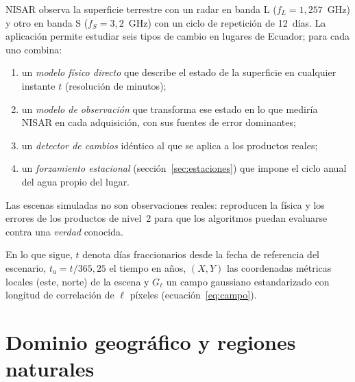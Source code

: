 \documentclass[11pt,a4paper]{article}
\begin{document}
NISAR observa la superficie terrestre con un radar en banda L ($f_L = 1{,}257$~GHz) y otro en banda S
($f_S = 3{,}2$~GHz) con un ciclo de repetición de 12~días. La aplicación permite estudiar seis tipos de
cambio en lugares de Ecuador; para cada uno combina:
\begin{enumerate}
  \item un \emph{modelo físico directo} que describe el estado de la superficie en cualquier instante
        $t$ (resolución de minutos);
  \item un \emph{modelo de observación} que transforma ese estado en lo que mediría NISAR en cada
        adquisición, con sus fuentes de error dominantes;
  \item un \emph{detector de cambios} idéntico al que se aplica a los productos reales;
  \item un \emph{forzamiento estacional} (sección~\ref{sec:estaciones}) que impone el ciclo anual del
        agua propio del lugar.
\end{enumerate}
Las escenas simuladas no son observaciones reales: reproducen la física y los errores de los
productos de nivel~2 para que los algoritmos puedan evaluarse contra una \emph{verdad} conocida.

En lo que sigue, $t$ denota días fraccionarios desde la fecha de referencia del escenario, $t_a = t/365{,}25$
el tiempo en años, $(X, Y)$ las coordenadas métricas locales (este, norte) de la escena y $G_\ell$ un
campo gaussiano estandarizado con longitud de correlación de $\ell$ píxeles (ecuación~\ref{eq:campo}).

\section{Dominio geográfico y regiones naturales}
\end{document}
